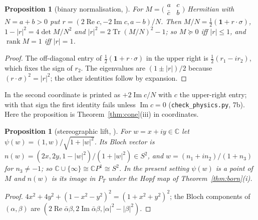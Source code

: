 \documentclass[aps,pra,onecolumn,superscriptaddress,nofootinbib,10pt]{revtex4-2}
\newtheorem{proposition}[theorem]{Proposition}
\theoremstyle{definition}
\theoremstyle{remark}
\newcommand{\C}{\mathbb{C}}
\newcommand{\rk}{\operatorname{rank}}
\newcommand{\re}{\operatorname{Re}}
\newcommand{\im}{\operatorname{Im}}
\newcommand{\tr}{\operatorname{Tr}}
\begin{document}
\begin{proposition}[binary normalisation, {\cite[Thm.~4.2]{CRQO}}]\label{prop:binary}
For $M=\bigl(\begin{smallmatrix}a&c\\\bar c&b\end{smallmatrix}\bigr)$ Hermitian with $N=a+b>0$ put
$r=(2\re c,-2\im c,a-b)/N$.  Then $M/N=\tfrac12(\mathbf1+r\cdot\sigma)$, $1-\lvert r\rvert^2=4\det M/N^2$
and $\lvert r\rvert^2=2\tr(M/N)^2-1$; so $M\succeq0$ iff $\lvert r\rvert\le1$, and $\rk M=1$ iff
$\lvert r\rvert=1$.
\end{proposition}
\begin{proof}
The off-diagonal entry of $\tfrac12(\mathbf1+r\cdot\sigma)$ in the upper right is $\tfrac12(r_1-ir_2)$,
which fixes the sign of $r_2$.  The eigenvalues are $(1\pm\lvert r\rvert)/2$ because $(r\cdot\sigma)^2=\lvert r\rvert^2$;
the other identities follow by expansion.
\end{proof}
In \cite{CRQO} the second coordinate is printed as $+2\im c/N$ with $c$ the upper-right entry; with that
sign the first identity fails unless $\im c=0$ (\texttt{check\_physics.py}, 7b).  Here the proposition is
Theorem~\ref{thm:cone}(iii) in coordinates.

\begin{proposition}[stereographic lift, {\cite[Prop.~4.3]{CRQO}}]\label{prop:stereo}
For $w=x+iy\in\C$ let $\psi(w)=(1,w)/\sqrt{1+\lvert w\rvert^2}$.  Its Bloch vector is
$n(w)=(2x,2y,1-\lvert w\rvert^2)/(1+\lvert w\rvert^2)\in S^2$, and $w=(n_1+in_2)/(1+n_3)$ for $n_3\ne-1$; so
$\C\cup\{\infty\}\cong\C P^1\cong S^2$.  In the present setting $\psi(w)$ is a point of $M$ and $n(w)$
is its image in $P_T$ under the Hopf map of Theorem~\ref{thm:born}(i).
\end{proposition}
\begin{proof}
$4x^2+4y^2+(1-x^2-y^2)^2=(1+x^2+y^2)^2$; the Bloch components of $(\alpha,\beta)$ are
$(2\re\bar\alpha\beta,2\im\bar\alpha\beta,\lvert\alpha\rvert^2-\lvert\beta\rvert^2)$.
\end{proof}
\end{document}
